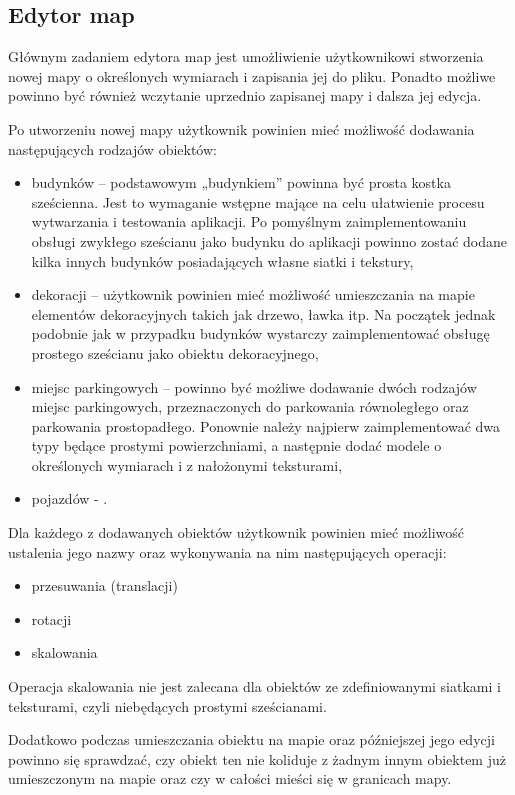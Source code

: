 \documentclass[a4paper,11pt,twoside]{report}
\theoremstyle{definition}
\begin{document}
\subsection{Edytor map}

Głównym zadaniem edytora map jest umożliwienie użytkownikowi stworzenia nowej mapy o określonych wymiarach i zapisania jej do pliku. Ponadto możliwe powinno być również wczytanie uprzednio zapisanej mapy i dalsza jej edycja.

Po utworzeniu nowej mapy użytkownik powinien mieć możliwość dodawania następujących rodzajów obiektów:
\begin{itemize}
	\item budynków – podstawowym „budynkiem” powinna być prosta kostka sześcienna. Jest to wymaganie wstępne mające na celu ułatwienie procesu wytwarzania i testowania aplikacji. Po pomyślnym zaimplementowaniu obsługi zwykłego sześcianu jako budynku do aplikacji powinno zostać dodane kilka innych budynków posiadających własne siatki i tekstury,
	\item dekoracji – użytkownik powinien mieć możliwość umieszczania na mapie elementów dekoracyjnych takich jak drzewo, ławka itp. Na początek jednak podobnie jak w przypadku budynków wystarczy zaimplementować obsługę prostego sześcianu jako obiektu dekoracyjnego,
	\item miejsc parkingowych – powinno być możliwe dodawanie dwóch rodzajów miejsc parkingowych, przeznaczonych do parkowania równoległego oraz parkowania prostopadłego. Ponownie należy najpierw zaimplementować dwa typy będące prostymi powierzchniami, a następnie dodać modele o określonych wymiarach i z nałożonymi teksturami,
	\item pojazdów - .
\end{itemize}

Dla każdego z dodawanych obiektów użytkownik powinien mieć możliwość ustalenia jego nazwy oraz wykonywania na nim następujących operacji:
\begin{itemize}
	\item przesuwania (translacji)
	\item rotacji
	\item skalowania
\end{itemize}

Operacja skalowania nie jest zalecana dla obiektów ze zdefiniowanymi siatkami i teksturami, czyli niebędących prostymi sześcianami.

Dodatkowo podczas umieszczania obiektu na mapie oraz późniejszej jego edycji powinno się sprawdzać, czy obiekt ten nie koliduje z żadnym innym obiektem już umieszczonym na mapie oraz czy w całości mieści się w granicach mapy.
\end{document}
